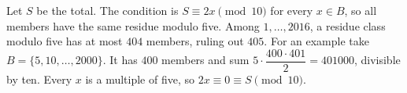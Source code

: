 Let $S$ be the total. The condition is $S\equiv2x\pmod{10}$ for every $x\in B$, so all members have the same residue modulo five. Among $1,\ldots,2016$, a residue class modulo five has at most $404$ members, ruling out $405$. For an example take $B=\{5,10,\ldots,2000\}$. It has $400$ members and sum $5\cdot\dfrac{400\cdot401}{2}=401000$, divisible by ten. Every $x$ is a multiple of five, so $2x\equiv0\equiv S\pmod{10}$.
